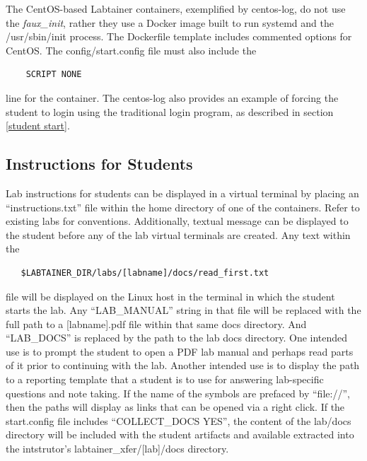 \documentclass[12pt]{article}
\begin{document}
The CentOS-based Labtainer containers, exemplified by centos-log, do not use the \textit{faux\_init}, rather they
use a Docker image built to run systemd and the /usr/sbin/init process.  The Dockerfile template includes
commented options for CentOS.  The config/start.config file must also include the 
\begin{verbatim}
    SCRIPT NONE
\end{verbatim}
\noindent line for the container.  The centos-log also provides an example of forcing 
the student to login using the traditional
login program, as described in section \ref{student start}.


\subsection {Instructions for Students} \label{instructions}
Lab instructions for students can be displayed in a virtual terminal by placing an
``instructions.txt'' file within the home directory of one of the containers.  Refer to existing
labs for conventions.  Additionally, textual message can be displayed to the student before any 
of the lab virtual terminals are created.  Any text within the 
\begin{verbatim}
   $LABTAINER_DIR/labs/[labname]/docs/read_first.txt
\end{verbatim}
\noindent file will be displayed on the Linux host in the terminal in which the student
starts the lab.  Any ``LAB\_MANUAL'' string in that file will be replaced with the full path
to a [labname].pdf file within that same docs directory.  And ``LAB\_DOCS'' is replaced by the
path to the lab docs directory.  One intended use is to prompt the
student to open a PDF lab manual and perhaps read parts of it prior to continuing with the lab.
Another intended use is to display the path to a reporting template that a student is to use
for answering lab-specific questions and note taking.  If the name of the symbols are prefaced
by ``file://'', then the paths will display as links that can be opened via a right click.
If the start.config file includes ``COLLECT\_DOCS YES'', the content of the lab/docs directory will be
included with the student artifacts and available extracted into the intstrutor's 
labtainer\_xfer/[lab]/docs directory.
\end{document}
